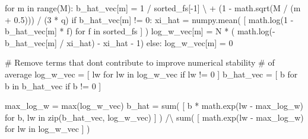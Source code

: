 \documentclass[
  letterpaper,
  DIV=11,
  numbers=noendperiod]{scrartcl}
\newenvironment{Shaded}{\begin{snugshade}}{\end{snugshade}}
\newcommand{\BuiltInTok}[1]{\textcolor[rgb]{0.00,0.23,0.31}{#1}}
\newcommand{\CommentTok}[1]{\textcolor[rgb]{0.37,0.37,0.37}{#1}}
\newcommand{\ControlFlowTok}[1]{\textcolor[rgb]{0.00,0.23,0.31}{#1}}
\newcommand{\DecValTok}[1]{\textcolor[rgb]{0.68,0.00,0.00}{#1}}
\newcommand{\FloatTok}[1]{\textcolor[rgb]{0.68,0.00,0.00}{#1}}
\newcommand{\KeywordTok}[1]{\textcolor[rgb]{0.00,0.23,0.31}{#1}}
\newcommand{\NormalTok}[1]{\textcolor[rgb]{0.00,0.23,0.31}{#1}}
\newcommand{\OperatorTok}[1]{\textcolor[rgb]{0.37,0.37,0.37}{#1}}
\begin{document}
\begin{Shaded}
\begin{Highlighting}[]
  \ControlFlowTok{for}\NormalTok{ m }\KeywordTok{in} \BuiltInTok{range}\NormalTok{(M):}
\NormalTok{    b\_hat\_vec[m] }\OperatorTok{=}   \DecValTok{1} \OperatorTok{/}\NormalTok{ sorted\_fs[}\OperatorTok{{-}}\DecValTok{1}\NormalTok{] }\OperatorTok{\textbackslash{}}
                   \OperatorTok{+}\NormalTok{ (}\DecValTok{1} \OperatorTok{{-}}\NormalTok{ math.sqrt(M }\OperatorTok{/}\NormalTok{ (m }\OperatorTok{+} \FloatTok{0.5}\NormalTok{))) }\OperatorTok{/}\NormalTok{ (}\DecValTok{3} \OperatorTok{*}\NormalTok{ q)}
    \ControlFlowTok{if}\NormalTok{ b\_hat\_vec[m] }\OperatorTok{!=} \DecValTok{0}\NormalTok{:}
\NormalTok{      xi\_hat }\OperatorTok{=}\NormalTok{ numpy.mean( [ math.log(}\DecValTok{1} \OperatorTok{{-}}\NormalTok{ b\_hat\_vec[m] }\OperatorTok{*}\NormalTok{ f) }
                             \ControlFlowTok{for}\NormalTok{ f }\KeywordTok{in}\NormalTok{ sorted\_fs ] )}
\NormalTok{      log\_w\_vec[m] }\OperatorTok{=}\NormalTok{ N }\OperatorTok{*}\NormalTok{ (   math.log(}\OperatorTok{{-}}\NormalTok{b\_hat\_vec[m] }\OperatorTok{/}\NormalTok{ xi\_hat) }
                           \OperatorTok{{-}}\NormalTok{ xi\_hat }\OperatorTok{{-}} \DecValTok{1}\NormalTok{)}
    \ControlFlowTok{else}\NormalTok{:}
\NormalTok{      log\_w\_vec[m] }\OperatorTok{=} \DecValTok{0}
  
  \CommentTok{\# Remove terms that don\textquotesingle{}t contribute to improve numerical stability }
  \CommentTok{\# of average}
\NormalTok{  log\_w\_vec }\OperatorTok{=}\NormalTok{ [ lw }\ControlFlowTok{for}\NormalTok{ lw }\KeywordTok{in}\NormalTok{ log\_w\_vec }\ControlFlowTok{if}\NormalTok{ lw }\OperatorTok{!=} \DecValTok{0}\NormalTok{ ]}
\NormalTok{  b\_hat\_vec }\OperatorTok{=}\NormalTok{ [ b }\ControlFlowTok{for}\NormalTok{ b }\KeywordTok{in}\NormalTok{ b\_hat\_vec }\ControlFlowTok{if}\NormalTok{ b }\OperatorTok{!=} \DecValTok{0}\NormalTok{ ]}
  
\NormalTok{  max\_log\_w }\OperatorTok{=} \BuiltInTok{max}\NormalTok{(log\_w\_vec)}
\NormalTok{  b\_hat }\OperatorTok{=} \BuiltInTok{sum}\NormalTok{( [ b }\OperatorTok{*}\NormalTok{ math.exp(lw }\OperatorTok{{-}}\NormalTok{ max\_log\_w) }
               \ControlFlowTok{for}\NormalTok{ b, lw }\KeywordTok{in} \BuiltInTok{zip}\NormalTok{(b\_hat\_vec, log\_w\_vec) ] ) }\OperatorTok{/\textbackslash{}}
          \BuiltInTok{sum}\NormalTok{( [ math.exp(lw }\OperatorTok{{-}}\NormalTok{ max\_log\_w) }\ControlFlowTok{for}\NormalTok{ lw }\KeywordTok{in}\NormalTok{ log\_w\_vec ] )}
  
\end{Highlighting}
\end{Shaded}
\end{document}
